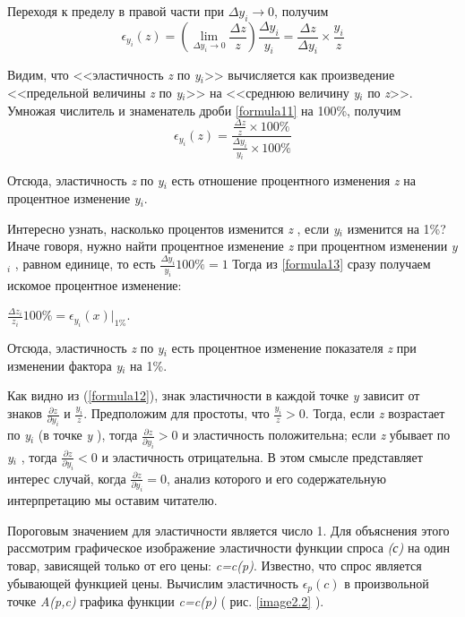 \documentclass[12pt, 4paper]{book}
\begin{document}
{Переходя к пределу в правой части при $\Delta y_i \rightarrow 0$, получим 
\begin{equation}
\label{formula13}
\epsilon_{y_{i}}(z)=\left(\lim\limits_{\Delta y_i \rightarrow 0} \frac{\Delta z}{z}\right){\frac{\Delta y_i}{y_i}}=\frac{\Delta z }{\Delta y_i} \times \frac{y_i}{z}
\end{equation}
\par
Видим, что <<эластичность \textit{z} по \textit{y${}_{i}$}>> вычисляется как произведение <<предельной величины \textit{z} по \textit{y${}_{i}$}>> на <<среднюю величину \textit{y${}_{i}$} по \textit{z}>>. 
Умножая числитель и знаменатель дроби \ref{formula11} на 100\%, получим
\begin{equation}
 \epsilon_{y_{i}}(z)=\frac{\frac{\Delta z}{z}\times 100\%} {\frac{\Delta y_i}{y_i}\times 100\%}
 \label{formula14}
\end{equation}
\par
Отсюда, эластичность \textit{z} по \textit{y${}_{i}$} есть отношение процентного изменения \textit{z} на процентное изменение \textit{y${}_{i}$}. 
\par
Интересно узнать, насколько процентов изменится \textit{z} , если \textit{y${}_{i}$} изменится на 1\%? Иначе говоря, нужно найти процентное изменение \textit{z} при процентном изменении \textit{y${}_{i}$} , равном единице, то есть 
$\frac{\Delta y_i}{y_i}100\%=1$ Тогда из \ref{formula13} сразу получаем искомое процентное изменение:
\begin{center}
$\frac{\Delta z_i}{z_i}100\%=\epsilon_{y_{i}}(x)|_{1\%}$.
\end{center}
\par
Отсюда, эластичность \textit{z} по \textit{y${}_{i}$} есть процентное изменение показателя \textit{z} при изменении фактора \textit{y${}_{i}$} на 1\%. 
\par
Как видно из (\ref{formula12}), знак эластичности в каждой точке \textit{y} зависит от знаков $\frac{\partial z}{\partial y_i}$ и $\frac{y_i}{z}$. Предположим для простоты, что $\frac{y_i}{z}>0 $. Тогда, если \textit{z} возрастает по \textit{y${}_{i}$} (в точке \textit{y} ), тогда $\frac{\partial z}{\partial y_i} > 0 $ и эластичность положительна; если \textit{z} убывает по \textit{y${}_{i}$} , тогда $\frac{\partial z}{\partial y_i}< 0 $ и эластичность отрицательна. В этом смысле представляет интерес случай, когда $\frac{\partial z}{\partial y_i} = 0 $, анализ которого и его содержательную интерпретацию мы оставим читателю.
\par
Пороговым значением для эластичности является число 1. Для объяснения этого рассмотрим графическое изображение эластичности функции спроса \textit{(с)} на один товар, зависящей только от его цены: \textit{c=c(p)}. Известно, что спрос является убывающей функцией цены. Вычислим эластичность $\epsilon_p(c)$ в произвольной точке \textit{A(p,c)} графика функции \textit{c=c(p)} ( рис. \ref{image2.2} ).
}
\end{document}
